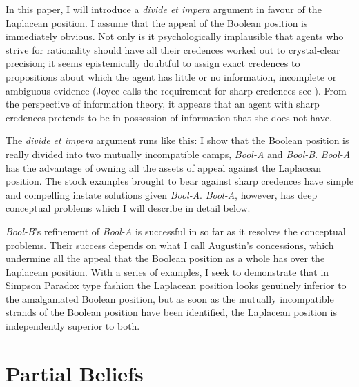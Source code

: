 \documentclass[11pt]{article}
\newcommand{\anderson}[0]{\textit{Bool-A}}
\newcommand{\augustin}[0]{\textit{Bool-B}}
\begin{document}

In this paper, I will introduce a \emph{divide et impera}
argument in favour of the Laplacean position. I assume that the appeal
of the Boolean position is immediately obvious. Not only is it
psychologically implausible that agents who strive for rationality
should have all their credences worked out to crystal-clear precision;
it seems epistemically doubtful to assign exact credences to
propositions about which the agent has little or no information,
incomplete or ambiguous evidence (Joyce calls the requirement for
sharp credences  see ). From
the perspective of information theory, it appears that an agent with
sharp credences pretends to be in possession of information that she
does not have.

The \emph{divide et impera} argument runs like this: I show that the
Boolean position is really divided into two mutually incompatible
camps, {\anderson} and {\augustin}. 
{\anderson} has the advantage of owning all the assets of appeal
against the Laplacean position. The stock examples brought to bear
against sharp credences have simple and compelling instate solutions
given {\anderson}. {\anderson}, however, has deep conceptual problems
which I will describe in detail below.

{\augustin}'s refinement of {\anderson} is successful in so far as it
resolves the conceptual problems. Their success depends on what I call
Augustin's concessions, which undermine all the appeal that the
Boolean position as a whole has over the Laplacean position. With a
series of examples, I seek to demonstrate that in Simpson Paradox type
fashion the Laplacean position looks genuinely inferior to the
amalgamated Boolean position, but as soon as the mutually incompatible
strands of the Boolean position have been identified, the Laplacean
position is independently superior to both.

\section{Partial Beliefs}
\label{amalgamated}
\end{document}
